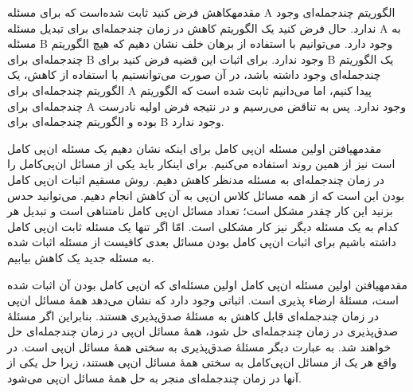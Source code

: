 
\begin{itemframe-s}{مقدمه}{کاهش}
\itm
فرض کنید ثابت شده‌است که برای مسئله A الگوریتم چندجمله‌ای وجود ندارد. حال فرض کنید یک الگوریتم کاهش در زمان چندجمله‌ای برای تبدیل مسئله A به مسئله B وجود دارد. می‌توانیم با استفاده از برهان خلف نشان دهیم که هیچ الگوریتم چندجمله‌ای برای B وجود ندارد.
\itm
برای اثبات این قضیه فرض کنید برای B یک الگوریتم چندجمله‌ای وجود داشته باشد، در آن صورت می‌توانستیم با استفاده از کاهش، یک الگوریتم چندجمله‌ای برای A پیدا کنیم، اما می‌دانیم ثابت شده است که الگوریتم چندجمله‌ای برای A وجود ندارد. پس به تناقض می‌رسیم و در نتیجه فرض اولیه نادرست بوده و الگوریتم چندجمله‌ای برای ‌B وجود ندارد.
\end{itemframe-s}
\begin{itemframe-s}{مقدمه}{یافتن اولین مسئله ان‌پی کامل}
\itm
برای اینکه نشان دهیم یک مسئله ان‌پی کامل است نیز از همین روند استفاده می‌کنیم. برای اینکار باید یکی از مسائل ان‌پی‌کامل را در زمان چندجمله‌ای به مسئله مدنظر کاهش دهیم.
\itm
روش مسقیم اثبات ان‌پی کامل بودن این است که از همه مسائل کلاس ان‌پی به آن کاهش انجام دهیم. می‌توانید حدس بزنید این کار چقدر مشکل است؛ تعداد مسائل ان‌پی کامل نامتناهی است و تبدیل هر کدام به یک مسئله دیگر نیز کار مشکلی است.
\itm
امّا اگر تنها یک مسئله ثابت ان‌پی کامل داشته باشیم برای اثبات ان‌پی کامل بودن مسائل بعدی کافیست از مسئله اثبات شده به مسئله جدید یک کاهش بیابیم.
\end{itemframe-s}

\begin{itemframe-s}{مقدمه}{یافتن اولین مسئله ان‌پی کامل}
\itm
اولین مسئله‌ای که ان‌پی کامل بودن آن اثبات شده است، مسئلهٔ ارضاء پذیری است.
اثباتی وجود دارد که نشان می‌دهد همهٔ مسائل ان‌پی در زمان چندجمله‌ای قابل کاهش به مسئلهٔ صدق‌پذیری هستند.
بنابراین اگر مسئلهٔ صدق‌پذیری در زمان چندجمله‌ای حل شود، همهٔ مسائل ان‌پی در زمان چندجمله‌ای حل خواهند شد. به عبارت دیگر مسئلهٔ صدق‌پذیری به سختی همهٔ مسائل ان‌پی است.
\itm
در واقع هر یک از مسائل ان‌پی‌کامل به سختی همهٔ مسائل ان‌پی هستند، زیرا حل یکی از آنها در زمان چندجمله‌ای منجر به حل همهٔ مسائل ان‌پی می‌شود.
\end{itemframe-s}

